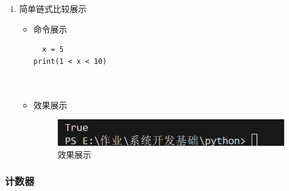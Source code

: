 \documentclass[UTF8]{ctexart}
\begin{document}
\begin{enumerate}
  \item 简单链式比较展示
  \begin{itemize}
  \item 命令展示
  \begin{verbatim}
  x = 5
print(1 < x < 10) 

    
  \end{verbatim}

  \item 效果展示
  \begin{figure}[H]
    \centering
    \includegraphics[width=\textwidth]{29} %
    \caption{效果展示}
  
  \end{figure}
\end{itemize}
\end{enumerate}





















\subsubsection{计数器}
\end{document}
